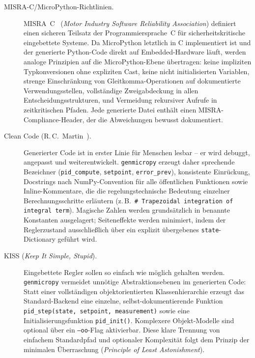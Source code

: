 \documentclass[a4paper,12pt]{article}
\theoremstyle{definition}
\begin{document}
\begin{description}
    \item[MISRA-C/MicroPython-Richtlinien.]
        MISRA~C~\cite{misra} (\emph{Motor Industry Software Reliability Association}) definiert
        einen sicheren Teilsatz der Programmiersprache~C für sicherheitskritische
        eingebettete Systeme. Da MicroPython letztlich in C implementiert ist und der
        generierte Python-Code direkt auf Embedded-Hardware läuft, werden analoge
        Prinzipien auf die MicroPython-Ebene übertragen: keine impliziten
        Typkonversionen ohne expliziten Cast, keine nicht initialisierten Variablen,
        strenge Einschränkung von Gleitkomma-Operationen auf dokumentierte
        Verwendungsstellen, vollständige Zweigabdeckung in allen
        Entscheidungsstrukturen, und Vermeidung rekursiver Aufrufe in
        zeitkritischen Pfaden. Jede generierte Datei enthält einen
        MISRA-Compliance-Header, der die Abweichungen bewusst dokumentiert.

    \item[Clean Code (R.\,C.~Martin~\cite{martin}).]
        Generierter Code ist in erster Linie für Menschen lesbar -- er wird
        debuggt, angepasst und weiterentwickelt. \texttt{genmicropy} erzeugt
        daher sprechende Bezeichner (\texttt{pid\_compute}, \texttt{setpoint},
        \texttt{error\_prev}), konsistente Einrückung, Docstrings nach
        NumPy-Convention für alle öffentlichen Funktionen sowie
        Inline-Kommentare, die die regelungstechnische Bedeutung einzelner
        Berechnungsschritte erläutern (z.\,B.\ \texttt{\# Trapezoidal
        integration of integral term}). Magische Zahlen werden grundsätzlich
        in benannte Konstanten ausgelagert; Seiteneffekte werden minimiert,
        indem der Reglerzustand ausschließlich über ein explizit übergebenes
        \texttt{state}-Dictionary geführt wird.

    \item[KISS (\emph{Keep It Simple, Stupid}).]
        Eingebettete Regler sollen so einfach wie möglich gehalten werden.
        \texttt{genmicropy} vermeidet unnötige Abstraktionsebenen im generierten
        Code: Statt einer vollständigen objektorientierten Klassen\-hierarchie
        erzeugt das Standard-Backend eine einzelne, selbst-dokumen\-tierende
        Funktion \texttt{pid\_step(state, setpoint, measurement)} sowie eine
        Initialisierungsfunktion \texttt{pid\_init()}. Komplexere
        Objekt-Modelle sind optional über ein \texttt{--oo}-Flag aktivierbar.
        Diese klare Trennung von einfachem Standardpfad und optionaler
        Komplexität folgt dem Prinzip der minimalen Überraschung
        (\emph{Principle of Least Astonishment}).
\end{description}
\end{document}
